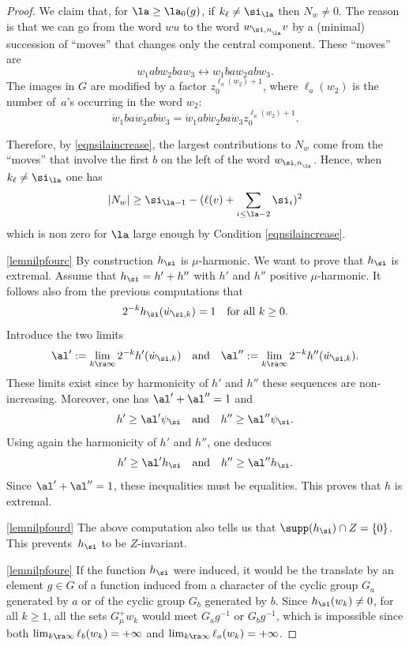 \begin{proof}
We claim that, for $\la\geq \la_0(g)$, if $k_\ell\neq \si_\la$ then $N_w\neq 0$.
The reason is that we can go from the word $wu$ to the word
$w_{\si,n_{_\la}}v$ by a (minimal) succession of ``moves'' that changes only the
central component.
These ``moves'' are
\[
w_1abw_2baw_3 \longleftrightarrow w_1baw_2abw_3.
\]
The images in $G$ are modified by a factor $z_0^{\ell_a(w_2)+1}$, where $\ell_a(w_2)$
is the number of~$a$'s occurring in the word $w_2$:
\[
\dot{w}_1ba\dot{w}_2ab\dot{w}_3 = \dot{w}_1ab\dot{w}_2ba\dot{w}_3z_0^{\ell_a(w_2)+1}.
\]

Therefore, by \eqref{eqnsilaincrease}, the largest contributions to $N_w$ come from the ``moves''
that involve the first $b$
on the left of the word $w_{\si,n_{_\la}}$. Hence,
when $k_\ell\neq \si_\la$ one has
\[
|N_{w}|\geq
\si_{\la-1}- (\ell(v)+
\sum_{i\leq \la-2}\si_i)^2
\]
which is non zero for $\la$ large enough by Condition \eqref{eqnsilaincrease}.

\eqref{lemnilpfourc} By construction $h_\si$ is $\mu$-harmonic.
We want to prove that $h_\si$ is extremal.
Assume that $h_\si=h'+h''$ with $h'$ and $h''$ positive $\mu$-harmonic.
It follows also from the previous computations
that
\[
2^{-k}h_\si(\dot{w}_{\si,k})=1
\quad\text{for all $k\geq 0$.}
\]
Introduce the two limits
\[
\al':=\lim_{k\ra\infty}2^{-k}h'(\dot{w}_{\si,k})
\quad\text{and}\quad
\al'':=\lim_{k\ra\infty}2^{-k}h''(\dot{w}_{\si,k}).
\]
These limits exist since by harmonicity of $h'$ and $h''$ these sequences are non-increasing.
Moreover, one has $\al'+\al''=1$ and
\[
h'\geq \al' \psi_\si
\quad\text{and}\quad
h''\geq \al'' \psi_\si.
\]
Using again the harmonicity of $h'$ and $h''$, one deduces
\[
h'\geq \al' h_\si
\quad\text{and}\quad
h''\geq \al'' h_\si.
\]
Since $\al'+\al''=1$, these inequalities must be equalities. This proves that $h$ is extremal.

\eqref{lemnilpfourd} The above computation also tells us that
$\supp(h_\si)\cap Z=\{0\}$.
This prevents~$h_\si$ to be $Z$-invariant.

\eqref{lemnilpfoure} If the function $h_\si$ were induced, it would be the translate by an element $g\in G$
of a function induced
from a character of the cyclic group $G_a$ generated by $a$ or
of the cyclic group $G_b$ generated by $b$.
Since $h_\si(w_k)\neq 0$, for all $k\geq 1$,
all the sets $G_\mu^+ w_k$ would meet $G_a g^{-1}$ or $G_b g^{-1}$, which is impossible since
both $\lim_{k\ra\infty}\ell_b(w_k)=+\infty$ and $\lim_{k\ra\infty}\ell_a(w_k)=+\infty$.
\end{proof}

\backmatter
